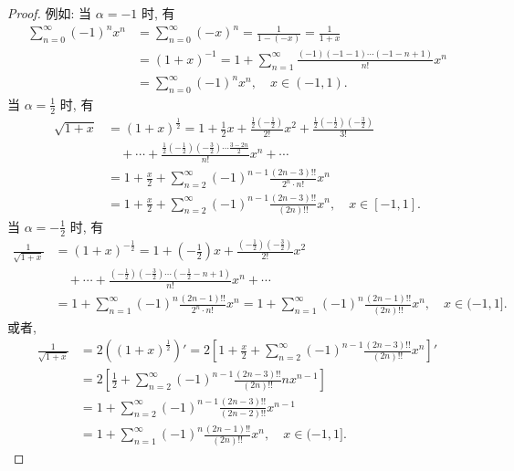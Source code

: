\begin{proof}
例如: 当 $\alpha=-1$ 时, 有
\[
  \begin{aligned}
    \sum_{n=0}^{\infty}(-1)^{n}x^{n}&=\sum_{n=0}^{\infty}(-x)^{n}=\frac{1}{1-(-x)}=\frac{1}{1+x}\\
    &=(1+x)^{-1}=1+\sum_{n=1}^{\infty}\frac{(-1)(-1-1)\cdots(-1-n+1)}{n!}x^{n}\\
    &=\sum_{n=0}^{\infty}(-1)^{n}x^{n},\quad x\in(-1,1).
  \end{aligned}
\]
当 $\alpha=\frac{1}{2}$ 时, 有
\[
  \begin{aligned}
    \sqrt{1+x}&=(1+x)^{\frac{1}{2}}=1+\frac{1}{2}x+\frac{\frac{1}{2}\left(-\frac{1}{2}\right)}{2!}x^{2}+\frac{\frac{1}{2}\left(-\frac{1}{2}\right)\left(-\frac{3}{2}\right)}{3!}\\
    &\quad+\cdots+\frac{\frac{1}{2}\left(-\frac{1}{2}\right)\left(-\frac{3}{2}\right)\cdots\frac{3-2n}{2}}{n!}x^{n}+\cdots\\
    &=1+\frac{x}{2}+\sum_{n=2}^{\infty}(-1)^{n-1}\frac{(2n-3)!!}{2^{n}\cdot n!}x^{n}\\
    &=1+\frac{x}{2}+\sum_{n=2}^{\infty}(-1)^{n-1}\frac{(2n-3)!!}{(2n)!!}x^{n},\quad x\in[-1,1].
  \end{aligned}
\]
当 $\alpha=-\frac{1}{2}$ 时, 有
\[
  \begin{aligned}
    \frac{1}{\sqrt{1+x}}&=(1+x)^{-\frac{1}{2}}=1+\left(-\frac{1}{2}\right)x+\frac{\left(-\frac{1}{2}\right)\left(-\frac{3}{2}\right)}{2!}x^{2}\\
    &\quad+\cdots+\frac{\left(-\frac{1}{2}\right)\left(-\frac{3}{2}\right)\cdots\left(-\frac{1}{2}-n+1\right)}{n!}x^{n}+\cdots\\
    &=1+\sum_{n=1}^{\infty}(-1)^{n}\frac{(2n-1)!!}{2^{n}\cdot n!}x^{n}=1+\sum_{n=1}^{\infty}(-1)^{n}\frac{(2n-1)!!}{(2n)!!}x^{n},\quad x\in(-1,1].
  \end{aligned}
\]
或者,
\[
  \begin{aligned}
    \frac{1}{\sqrt{1+x}}&=2\left((1+x)^{\frac{1}{2}}\right)'=2\left[1+\frac{x}{2}+\sum_{n=2}^{\infty}(-1)^{n-1}\frac{(2n-3)!!}{(2n)!!}x^{n}\right]'\\
    &=2\left[\frac{1}{2}+\sum_{n=2}^{\infty}(-1)^{n-1}\frac{(2n-3)!!}{(2n)!!}nx^{n-1}\right]\\
    &=1+\sum_{n=2}^{\infty}(-1)^{n-1}\frac{(2n-3)!!}{(2n-2)!!}x^{n-1}\\
    &=1+\sum_{n=1}^{\infty}(-1)^{n}\frac{(2n-1)!!}{(2n)!!}x^{n},\quad x\in(-1,1].
  \end{aligned}
\]
\end{proof}

